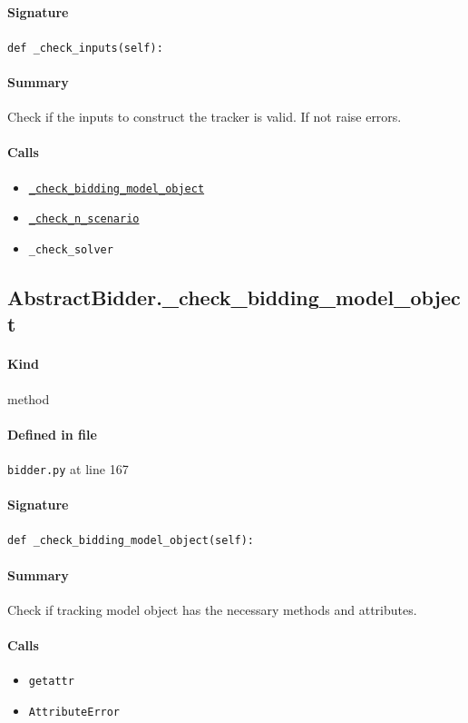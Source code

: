 \documentclass[11pt]{report}
\begin{document}
\paragraph{Signature} \texttt{def \_check\_inputs(self):}
\paragraph{Summary} Check if the inputs to construct the tracker is valid. If not raise errors.
\paragraph{Calls}
\begin{itemize}[leftmargin=*]
  \item \hyperref[def:bidder.py:AbstractBidder._check_bidding_model_object:L167]{\texttt{\_check\_bidding\_model\_object}}
  \item \hyperref[def:bidder.py:AbstractBidder._check_n_scenario:L192]{\texttt{\_check\_n\_scenario}}
  \item \texttt{\_check\_solver}
\end{itemize}
\subsection{AbstractBidder.\_check\_bidding\_model\_object}
\label{def:bidder.py:AbstractBidder._check_bidding_model_object:L167}
\paragraph{Kind} method
\paragraph{Defined in file} \texttt{bidder.py} at line 167
\paragraph{Signature} \texttt{def \_check\_bidding\_model\_object(self):}
\paragraph{Summary} Check if tracking model object has the necessary methods and attributes.
\paragraph{Calls}
\begin{itemize}[leftmargin=*]
  \item \texttt{getattr}
  \item \texttt{AttributeError}
\end{itemize}
\end{document}
